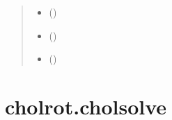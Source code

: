 \documentclass[a4paper,11pt,english]{sphinxmanual}
\begin{document}
\begin{fulllineitems}
\begin{quote}
\begin{description}
\begin{itemize}
\item {} 
\sphinxAtStartPar
{} ()

\item {} 
\sphinxAtStartPar
{} (\sphinxstyleliteralemphasis{\sphinxupquote{{[}}}\sphinxstyleliteralemphasis{\sphinxupquote{, }}\sphinxstyleliteralemphasis{\sphinxupquote{, }}\sphinxstyleliteralemphasis{\sphinxupquote{, }}\sphinxstyleliteralemphasis{\sphinxupquote{{]}}})

\item {} 
\sphinxAtStartPar
{} ()

\end{itemize}

\sphinxAtStartPar
{}

\end{description}\end{quote}

\end{fulllineitems}


\sphinxstepscope


\section{cholrot.cholsolve}
\label{\detokenize{generated/cholrot.cholsolve:cholrot-cholsolve}}\label{\detokenize{generated/cholrot.cholsolve::doc}}
\end{document}
